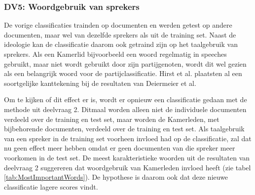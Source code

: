 \subsubsection{DV5: Woordgebruik van sprekers}
De vorige classificaties trainden op documenten en werden getest op andere documenten, maar wel van dezelfde sprekers als uit de training set. Naast de ideologie kan de classificatie daarom ook getraind zijn op het taalgebruik van sprekers. Als een Kamerlid bijvoorbeeld een woord regelmatig in speeches gebruikt, maar niet wordt gebruikt door zijn partijgenoten, wordt dit wel gezien als een belangrijk woord voor de partijclassificatie. Hirst et al. \cite{Hirst_textto} plaatsten al een soortgelijke kanttekening bij de resultaten van Deiermeier et al.\par
Om te kijken of dit effect er is, wordt er opnieuw een classificatie gedaan met de methode uit deelvraag 2. Ditmaal worden alleen niet de individuele documenten verdeeld over de training en test set, maar worden de Kamerleden, met bijbehorende documenten, verdeeld over de training en test set. Als taalgebruik van een spreker in de training set voorheen invloed had op de classificatie, zal dat nu geen effect meer hebben omdat er geen documenten van die spreker meer voorkomen in de test set. De meest karakteristieke woorden uit de resultaten van deelvraag 2 suggereren dat woordgebruik van Kamerleden invloed heeft (zie tabel \ref{tab:MostImportantWords}). De hypothese is daarom ook dat deze nieuwe classificatie lagere scores vindt.\par


